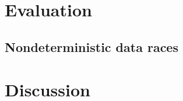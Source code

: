 
\section{Evaluation}
\label{sec:quicksand-eval}

\subsection{Nondeterministic data races}
\label{sec:quicksand-eval-nondets}


\section{Discussion}
\label{sec:quicksand-discussion}

